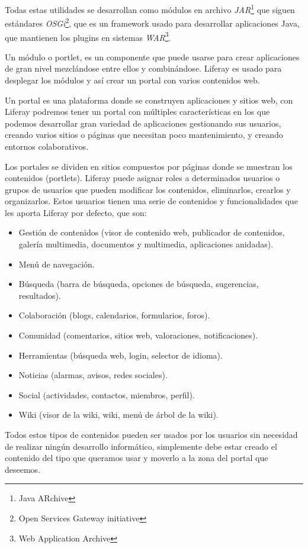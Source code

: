 \documentclass[a4paper, 12pt]{book}
\begin{document}
Todas estas utilidades se desarrollan como módulos en archivo \textit{JAR}\footnote{Java ARchive} que siguen estándares \textit{OSGi}\footnote{Open Services Gateway initiative}, que es un framework usado para desarrollar aplicaciones Java, que mantienen los plugins en sistemas \textit{WAR}\footnote{Web Application Archive}.

\vspace{5mm}
Un módulo o portlet, es un componente que puede usarse para crear aplicaciones de gran nivel mezclándose entre ellos y combinándose. Liferay es usado para desplegar los módulos y así crear un portal con varios contenidos web.

Un portal es una plataforma donde se construyen aplicaciones y sitios web, con Liferay podremos tener un portal con múltiples características en los que podemos desarrollar gran variedad de aplicaciones gestionando sus usuarios, creando varios sitios o páginas que necesitan poco mantenimiento, y creando entornos colaborativos.

Los portales se dividen en sitios compuestos por páginas donde se muestran los contenidos (portlets). Liferay puede asignar roles a determinados usuarios o grupos de usuarios que pueden modificar los contenidos, eliminarlos, crearlos y organizarlos. Estos usuarios tienen una serie de contenidos y funcionalidades que les aporta Liferay por defecto, que son:

\begin{itemize}
\item Gestión de contenidos (visor de contenido web, publicador de contenidos, galería multimedia, documentos y multimedia, aplicaciones anidadas).
\item Menú de navegación.
\item Búsqueda (barra de búsqueda, opciones de búsqueda, sugerencias, resultados).
\item Colaboración (blogs, calendarios, formularios, foros).
\item Comunidad (comentarios, sitios web, valoraciones, notificaciones).
\item Herramientas (búsqueda web, login, selector de idioma).
\item Noticias (alarmas, avisos, redes sociales).
\item Social (actividades, contactos, miembros, perfil).
\item Wiki (visor de la wiki, wiki, menú de árbol de la wiki).
\end{itemize}

Todos estos tipos de contenidos pueden ser usados por los usuarios sin necesidad de realizar ningún desarrollo informático, simplemente debe estar creado el contenido del tipo que queramos usar y moverlo a la zona del portal que deseemos. 
\end{document}
